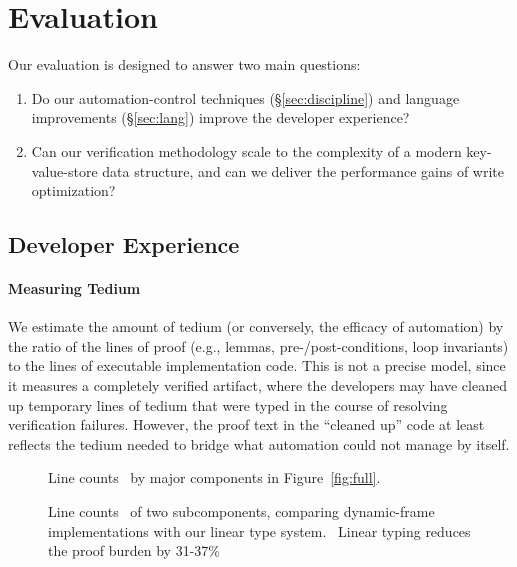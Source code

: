 \section{Evaluation}\label{sec:eval}

Our evaluation is designed to answer two main questions:
\begin{enumerate}
  \item Do our automation-control techniques (\S\ref{sec:discipline}) and language
    improvements (\S\ref{sec:lang}) improve the developer experience? 
  \item Can our verification methodology scale to the complexity of a
    modern key-value-store data structure, and can we deliver the
    performance gains of write optimization?
\end{enumerate}


\subsection{Developer Experience}\label{sec:eval:effort}

\paragraph{Measuring Tedium}\label{eval:tedium}
We estimate the amount of tedium (or conversely, the efficacy of automation)
by the ratio of the lines of proof 
(e.g., lemmas, pre-/post-conditions, loop invariants)
to the lines of executable implementation code.
This is not a precise model, since it measures a completely verified artifact,
where the developers may have cleaned up temporary lines of tedium that
were typed in the course of resolving verification failures.
However, the proof text in the ``cleaned up'' code at least
reflects the tedium needed to bridge what automation
could not manage by itself.

\begin{figure}
\begin{center}

\end{center}
  \vspace{-3mm}
\caption{Line counts~\cite{sloc} by major components in Figure~\ref{fig:full}.}
\label{line-counts}
\end{figure}

\begin{figure}
\begin{center}

\end{center}
  \vspace{-3mm}
\caption{Line counts~\cite{sloc} of two subcomponents, comparing dynamic-frame implementations with  our linear type system.\protect\footnotemark~
        Linear typing reduces the proof burden by 31-37\%}
\label{line-counts-micro}
  \vspace{-2mm}
\end{figure}

